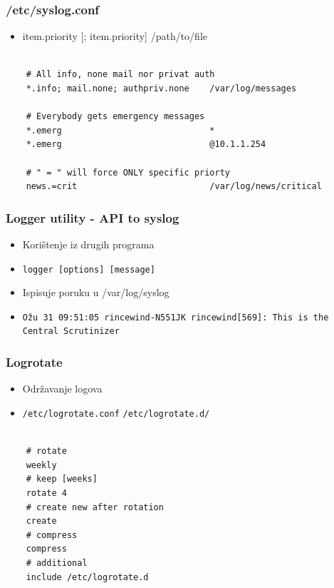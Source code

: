 \documentclass[t,table,usenames,dvipsnames]{beamer}
\newcommand{\shell}[1]{\texttt{#1}}
\begin{document}
\begin{frame}[fragile]
    \frametitle{/etc/syslog.conf}
    \begin{itemize}
        \item item.priority [; item.priority]   /path/to/file
    \end{itemize}
    \begin{verbatim}

    # All info, none mail nor privat auth
    *.info; mail.none; authpriv.none    /var/log/messages

    # Everybody gets emergency messages
    *.emerg                             *
    *.emerg                             @10.1.1.254
    
    # " = " will force ONLY specific priorty
    news.=crit                          /var/log/news/critical

    \end{verbatim}

\end{frame}

\begin{frame}[fragile]
    \frametitle{Logger utility - API to syslog}

    \begin{itemize}
        \item Korištenje iz drugih programa

        \item \shell{logger [options] [message]}
        \item Ispisuje poruku u /var/log/syslog

        \item \shell{Ožu 31 09:51:05 rincewind-N551JK rincewind[569]: This is the Central Scrutinizer}

    \end{itemize}

\end{frame}

\begin{frame}[fragile]
    \frametitle{Logrotate}
    \begin{itemize}
        \item Održavanje logova
        \item \shell{/etc/logrotate.conf} \shell{/etc/logrotate.d/}
    \end{itemize}

    \begin{verbatim}

    # rotate
    weekly
    # keep [weeks]
    rotate 4
    # create new after rotation
    create
    # compress
    compress
    # additional
    include /etc/logrotate.d

    \end{verbatim}

\end{frame}
\end{document}
